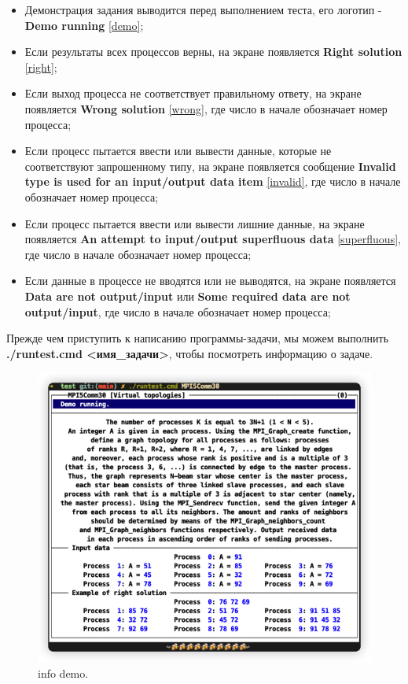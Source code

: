 \begin{itemize} 
    \item Демонстрация задания выводится перед выполнением теста, его логотип - \textbf{Demo running} \ref{demo};
    \item Если результаты всех процессов верны, на экране появляется \textbf{Right solution} \ref{right};
    \item Если выход процесса не соответствует правильному ответу, на экране появляется \textbf{Wrong solution} \ref{wrong}, где число в начале обозначает номер процесса;
    \item Если процесс пытается ввести или вывести данные, которые не соответствуют запрошенному типу, на экране появляется сообщение \textbf{Invalid type is used for an input/output data item} \ref{invalid}, где число в начале обозначает номер процесса;
    \item Если процесс пытается ввести или вывести лишние данные, на экране появляется \textbf{An attempt to input/output superfluous data} \ref{superfluous}, где число в начале обозначает номер процесса;
    \item Если данные в процессе не вводятся или не выводятся, на экране появляется \textbf{Data are not output/input} или \textbf{Some required data are not output/input}, где число в начале обозначает номер процесса;
\end{itemize}

Прежде чем приступить к написанию программы-задачи, мы можем выполнить \textbf{./runtest.cmd <имя\_задачи>}, чтобы посмотреть информацию о задаче.
\begin{figure}[htbp]%
    \centering
    \includegraphics[width=0.8\linewidth]{images/example.png}%
    \caption{info demo.}%
    \label{example}%
\end{figure}


